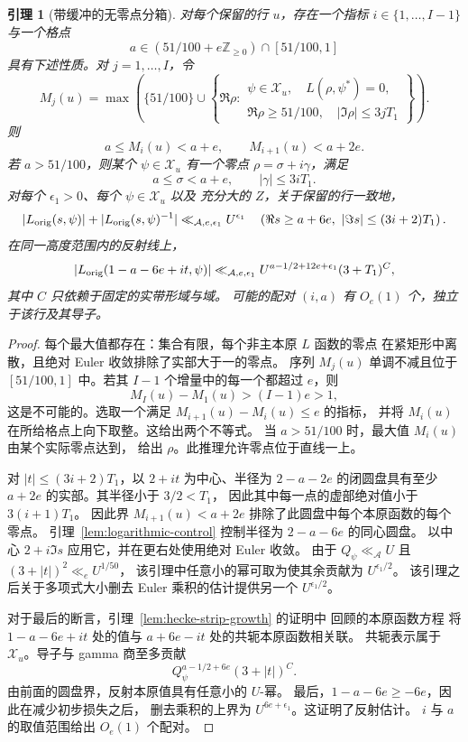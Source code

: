 \documentclass[11pt,a4paper]{article}
\numberwithin{equation}{section}
\numberwithin{figure}{section}
\newtheorem{lemma}[theorem]{引理}
\theoremstyle{definition}
\theoremstyle{remark}
\begin{document}
\begin{lemma}[带缓冲的无零点分箱]\label{lem:buffered-bins}
对每个保留的行 \(u\)，存在一个指标 \(i\in\{1,\ldots,I-1\}\)
与一个格点
\[
 a\in(51/100+e\mathbb Z_{\ge0})\cap[51/100,1]
\]
具有下述性质。对 \(j=1,\ldots,I\)，令
\[
 M_j(u)=\max\left(\{51/100\}\cup
 \left\{\Re\rho:
 \begin{array}{l}
  \psi\in\mathcal X_u,\quad L(\rho,\psi^*)=0,\\
  \Re\rho\ge51/100,\quad |\Im\rho|\le3jT_1
 \end{array}\right\}\right).
\]
则
\[
 a\le M_i(u)<a+e,\qquad M_{i+1}(u)<a+2e.
\]
若 \(a>51/100\)，则某个 \(\psi\in\mathcal X_u\) 有一个零点
\(\rho=\sigma+i\gamma\)，满足
\[
 a\le\sigma<a+e,\qquad |\gamma|\le3iT_1.
\]
对每个 \(\epsilon_1>0\)、每个 \(\psi\in\mathcal X_u\) 以及
充分大的 \(Z\)，关于保留的行一致地，
\[
 |L_{\rm orig}(s,\psi)|+|L_{\rm orig}(s,\psi)^{-1}|
 \ll_{\mathcal A,e,\epsilon_1} U^{\epsilon_1}
 \quad
 \left(\Re s\ge a+6e,\ |\Im s|\le(3i+2)T_1\right).
\]
在同一高度范围内的反射线上，
\[
 |L_{\rm orig}(1-a-6e+it,\psi)|
 \ll_{\mathcal A,e,\epsilon_1}
 U^{a-1/2+12e+\epsilon_1}(3+T_1)^C,
\]
其中 \(C\) 只依赖于固定的实带形域与域。
可能的配对 \((i,a)\) 有 \(O_e(1)\) 个，独立于该行及其导子。
\end{lemma}

\begin{proof}
每个最大值都存在：集合有限，每个非主本原 \(L\) 函数的零点
在紧矩形中离散，且绝对 Euler 收敛排除了实部大于一的零点。
序列 \(M_j(u)\) 单调不减且位于 \([51/100,1]\) 中。若其
\(I-1\) 个增量中的每一个都超过 \(e\)，则
\[
 M_I(u)-M_1(u)>(I-1)e>1,
\]
这是不可能的。选取一个满足 \(M_{i+1}(u)-M_i(u)\le e\) 的指标，
并将 \(M_i(u)\) 在所给格点上向下取整。这给出两个不等式。
当 \(a>51/100\) 时，最大值 \(M_i(u)\) 由某个实际零点达到，
给出 \(\rho\)。此推理允许零点位于直线一上。

对 \(|t|\le(3i+2)T_1\)，以 \(2+it\) 为中心、半径为 \(2-a-2e\)
的闭圆盘具有至少 \(a+2e\) 的实部。其半径小于 \(3/2<T_1\)，
因此其中每一点的虚部绝对值小于 \(3(i+1)T_1\)。
因此界 \(M_{i+1}(u)<a+2e\) 排除了此圆盘中每个本原函数的每个零点。
引理~\ref{lem:logarithmic-control} 控制半径为 \(2-a-6e\) 的同心圆盘。
以中心 \(2+i\Im s\) 应用它，并在更右处使用绝对 Euler 收敛。
由于 \(Q_\psi\ll_{\mathcal A}U\) 且 \((3+|t|)^2\ll_e U^{1/50}\)，
该引理中任意小的幂可取为使其余贡献为 \(U^{\epsilon_1/2}\)。
该引理之后关于多项式大小删去 Euler 乘积的估计提供另一个
\(U^{\epsilon_1/2}\)。

对于最后的断言，引理~\ref{lem:hecke-strip-growth} 的证明中
回顾的本原函数方程 \cite[方程 (1.1)]{GZ} 将
\(1-a-6e+it\) 处的值与 \(a+6e-it\) 处的共轭本原函数相关联。
共轭表示属于 \(\mathcal X_u\)。导子与 gamma 商至多贡献
\[
 Q_\psi^{a-1/2+6e}(3+|t|)^C.
\]
由前面的圆盘界，反射本原值具有任意小的 \(U\)-幂。
最后，\(1-a-6e\ge-6e\)，因此在减少初步损失之后，
删去乘积的上界为 \(U^{6e+\epsilon_1}\)。这证明了反射估计。
\(i\) 与 \(a\) 的取值范围给出 \(O_e(1)\) 个配对。
\end{proof}
\end{document}

